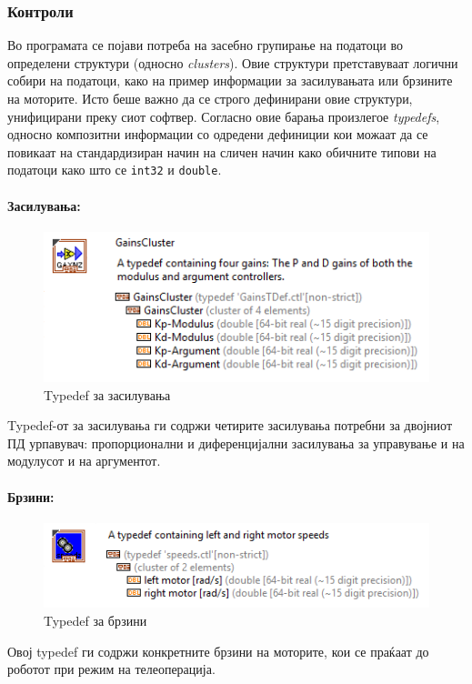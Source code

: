 \documentclass[12pt]{article}
\begin{document}
    \subsubsection{Контроли}
      Во програмата се појави потреба на засебно групирање на податоци во определени структури (односно \textit{clusters}). Овие структури претставуваат логични собири на податоци, како на пример информации за засилувањата или брзините на моторите. Исто беше важно да се строго дефинирани овие структури, унифицирани преку сиот софтвер. Согласно овие барања произлегое \textit{typedefs}, односно композитни информации со одредени дефиниции кои можаат да се повикаат на стандардизиран начин на сличен начин како обичните типови на податоци како што се \verb+int32+ и \verb+double+. 
    \paragraph{Засилувања:\\}
	\begin{figure}[H]
	    \includegraphics[width=0.55\linewidth]{./images/typedef_gains_border.PNG}
		\caption{Typedef за засилувања}
	    \label{fig:gain_typedef}
	    \raggedright
	    \end{figure}
        Typedef-от за засилувања ги содржи четирите засилувања потребни за двојниот ПД урпавувач: пропорционални и диференцијални засилувања за управување и на модулусот и на аргументот.

    \paragraph{Брзини:\\}
	\begin{figure}[H]
	    \includegraphics[width=0.55\linewidth]{./images/typedef_speeds_border.PNG}
		\caption{Typedef за брзини}
	    \label{fig:gain_typedef}
	    \raggedright
	    \end{figure}
	Овој typedef ги содржи конкретните брзини на моторите, кои се праќаат до роботот при режим на телеоперација.
\end{document}
